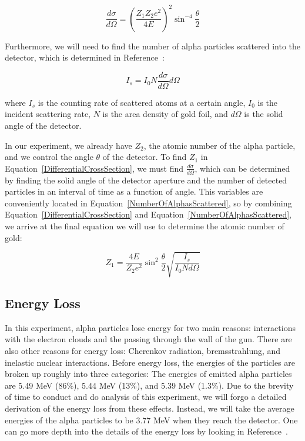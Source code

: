 \begin{equation}
  \frac{d\sigma}{d\Omega}=\left  (\frac{Z_1Z_2e^2}{4E} \right )^2\sin^{-4}{\frac{\theta}{2}}
  \label{DifferentialCrossSection}
\end{equation}    

Furthermore, we will need to find the number of alpha particles scattered into the detector, which is determined in Reference~\cite{Melissinos}:

\begin{equation}
  I_s = I_0 N \frac{d\sigma}{d\Omega} d\Omega
  \label{NumberOfAlphasScattered}
\end{equation}   

where $I_s$ is the counting rate of scattered atoms at a certain angle, $I_0$ is the incident scattering rate, $N$ is the area density of gold foil, and $d\Omega$ is the solid angle of the detector. 

In our experiment, we already have $Z_2$, the atomic number of the alpha particle, and we control the angle $\theta$ of the detector. To find $Z_1$ in Equation~\ref{DifferentialCrossSection}, we must find $\frac{d\sigma}{d\Omega}$, which can be determined by finding the solid angle of the detector aperture and the number of detected particles in an interval of time as a function of angle. This variables are conveniently located in Equation~\ref{NumberOfAlphasScattered}, so by combining Equation~\ref{DifferentialCrossSection} and Equation~\ref{NumberOfAlphasScattered}, we arrive at the final equation we will use to determine the atomic number of gold:

\begin{equation}
  Z_1 = \frac{4E}{Z_2e^2} \sin^{2}{\frac{\theta}{2}} \sqrt{\frac{I_s}{I_0 N d \Omega}}
  \label{FinalEquation}
\end{equation} 

\subsection{Energy Loss}

In this experiment, alpha particles lose energy for two main reasons: interactions with the electron clouds and the passing through the wall of the gun. There are also other reasons for energy loss: Cherenkov radiation, bremsstrahlung, and inelastic nuclear interactions. Before energy loss, the energies of the particles are broken up roughly into three categories: The energies of emitted alpha particles are 5.49 MeV (86\%), 5.44 MeV (13\%), and 5.39 MeV (1.3\%). Due to the brevity of time to conduct and do analysis of this experiment, we will forgo a detailed derivation of the energy loss from these effects. Instead, we will take the average energies of the alpha particles to be 3.77 MeV when they reach the detector. One can go more depth into the details of the energy loss by looking in Reference~\cite{Comfort}.

